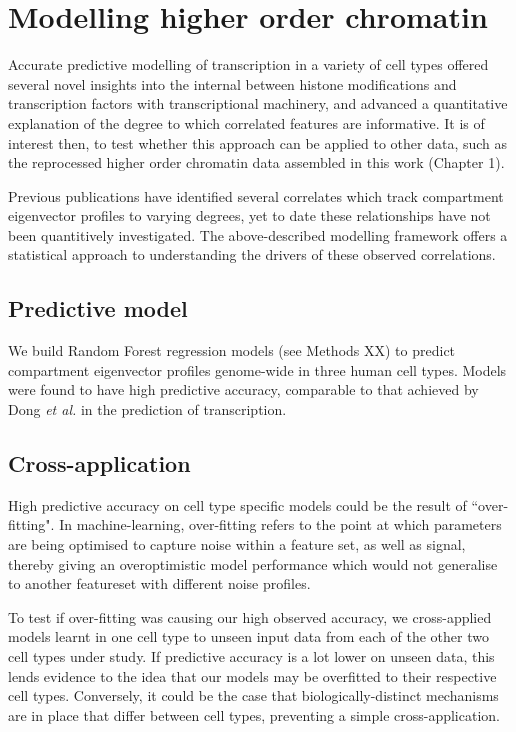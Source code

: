 \documentclass[a4paper,11pt,oneside]{book}
\begin{document}
\section{Modelling higher order chromatin}

Accurate predictive modelling of transcription in a variety of cell types offered several novel insights into the internal between histone modifications and transcription factors with transcriptional machinery, and advanced a quantitative explanation of the degree to which correlated features are informative. It is of interest then, to test whether this approach can be applied to other data, such as the reprocessed higher order chromatin data assembled in this work (Chapter 1).

Previous publications have identified several correlates which track compartment eigenvector profiles to varying degrees,\cite{Lieberman2009, Imakaev2012} yet to date these relationships have not been quantitively investigated. The above-described modelling framework offers a statistical approach to understanding the drivers of these observed correlations.

\subsection{Predictive model}

We build Random Forest regression models (see Methods XX) to predict compartment eigenvector profiles genome-wide in three human cell types. Models were found to have high predictive accuracy, comparable to that achieved by Dong \emph{et al.}\cite{Dong2012} in the prediction of transcription.

\subsection{Cross-application}

High predictive accuracy on cell type specific models could be the result of ``over-fitting". In machine-learning, over-fitting refers to the point at which parameters are being optimised to capture noise within a feature set, as well as signal, thereby giving an overoptimistic model performance which would not generalise to another featureset with different noise profiles.

To test if over-fitting was causing our high observed accuracy, we cross-applied models learnt in one cell type to unseen input data from each of the other two cell types under study. If predictive accuracy is a lot lower on unseen data, this lends evidence to the idea that our models may be overfitted to their respective cell types. Conversely, it could be the case that biologically-distinct mechanisms are in place that differ between cell types, preventing a simple cross-application.
\end{document}

